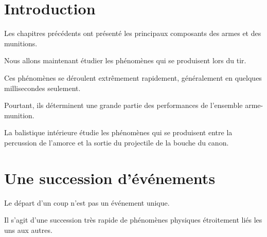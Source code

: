 
\section{Introduction}

Les chapitres précédents ont présenté les principaux composants des armes et
des munitions.

Nous allons maintenant étudier les phénomènes qui se produisent lors du tir.

Ces phénomènes se déroulent extrêmement rapidement, généralement en quelques
millisecondes seulement.

Pourtant, ils déterminent une grande partie des performances de l'ensemble
arme-munition.

\begin{aretenir}

La balistique intérieure étudie les phénomènes qui se produisent entre la
percussion de l'amorce et la sortie du projectile de la bouche du canon.

\end{aretenir}

\section{Une succession d'événements}

Le départ d'un coup n'est pas un événement unique.

Il s'agit d'une succession très rapide de phénomènes physiques étroitement
liés les uns aux autres.

